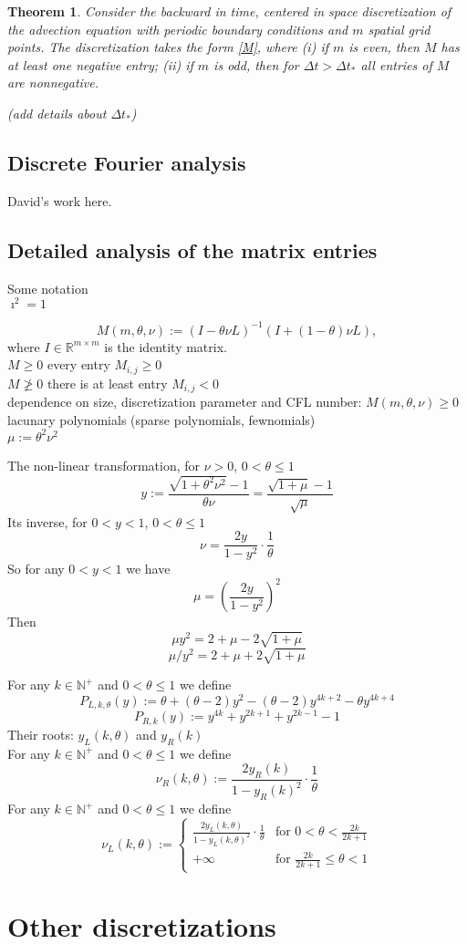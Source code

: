 \documentclass[a4paper]{article}
\newtheorem{theorem}{Theorem}
\newcommand{\dt}{\Delta t}
\newcommand{\te}{\theta}
\newcommand{\nul}{\nu_L(k,\theta)}
\newcommand{\nur}{\nu_R(k,\theta)}
\newcommand{\yl}{y_L(k,\theta)}
\newcommand{\yr}{y_R(k)}
\newcommand{\nplus}{\mathbb{N}^+}
\newcommand{\rr}{\mathbb{R}}
\newcommand{\Por}{P_{R,k}(y)}
\newcommand{\Pol}{P_{L,k,\te}(y)}
\begin{document}
\begin{theorem}
Consider the backward in time, centered in space discretization of the
advection equation with periodic boundary conditions and $m$ spatial grid
points.  The discretization takes the form \eqref{M},
where (i) if $m$ is even, then $M$ has at least one negative entry;
(ii) if $m$ is odd, then for $\dt>\dt_*$ all entries of $M$ are nonnegative.

(add details about $\dt_*$)
\end{theorem}

\subsection{Discrete Fourier analysis}
David's work here.

\subsection{Detailed analysis of the matrix entries}
Some notation \\

$\imath^2=1$ 

\[
M(m,\te,\nu):=(I-\te\nu L)^{-1}(I+(1-\te)\nu L),
\]
where $I\in\rr^{m\times m}$ is the identity matrix.\\

$M\ge 0$ every entry $M_{i,j}\ge 0$\\

$M\not\ge 0$ there is at least entry $M_{i,j}<0$\\

dependence on size, discretization parameter and CFL number: $M(m,\te,\nu)\ge 0$\\

lacunary polynomials (sparse polynomials, fewnomials)\\

$\mu:=\te^2\nu^2$

The non-linear transformation, for $\nu>0$, $0<\te\le 1$
\[
y:=\frac{\sqrt{1+\te^2\nu^2}-1}{\te\nu}=\frac{\sqrt{1+\mu}-1}{\sqrt{\mu}}
\]
Its inverse, for $0<y<1$, $0<\te\le 1$
\[
\nu=\frac{2y}{1-y^2}\cdot\frac{1}{\te}
\]
So for any $0<y<1$ we have
\[
\mu=\left(\frac{2y}{1-y^2}\right)^2
\]
Then
\[\mu y^2=2+\mu-2\sqrt{1+\mu}\]
\[\mu/y^2=2+\mu+2\sqrt{1+\mu}\]


For any $k\in\nplus$ and $0<\te\le 1$ we define
\[\Pol:=\theta +(\theta -2) y^2-(\theta -2) y^{4 k+2}-\theta  y^{4 k+4}\]
\[\Por:=y^{4 k}+y^{2 k+1}+y^{2 k-1}-1\]
Their roots: $\yl$ and $\yr$\\
For any $k\in\nplus$ and $0<\te\le 1$ we define
\[\nur:=\frac{2\yr}{1-\yr^2}\cdot \frac{1}{\te}\]
For any $k\in\nplus$ and $0<\te\le 1$ we define
\[\nul:=\begin{cases}
 \frac{2\yl}{1-\yl^2}\cdot \frac{1}{\te} & \text{for } 0<\te<\frac{2k}{2k+1}\\
 +\infty & \text{for } \frac{2k}{2k+1}\le \te<1
\end{cases}\]

\section{Other discretizations}
\end{document}
